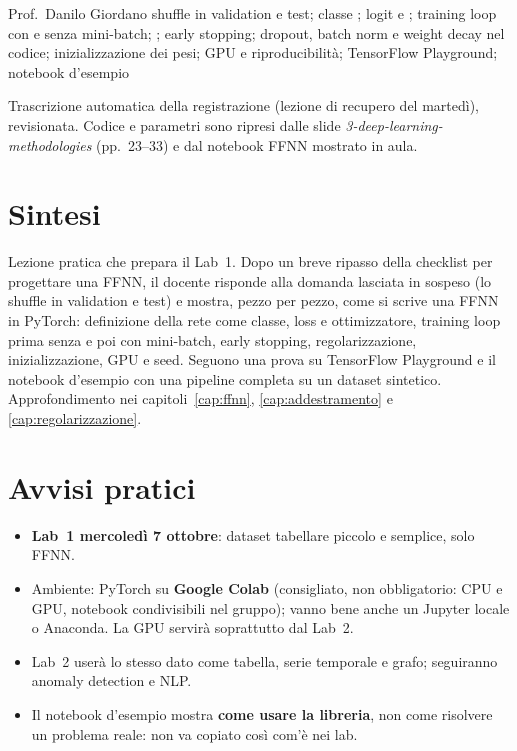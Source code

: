   {Prof.~Danilo Giordano}
  {shuffle in validation e test; classe ; logit e ; training
   loop con e senza mini-batch; ; early stopping; dropout, batch norm e weight
   decay nel codice; inizializzazione dei pesi; GPU e riproducibilità; TensorFlow Playground;
   notebook d'esempio}
\label{lez:2026-10-06}

\begin{nota}[Fonte]
Trascrizione automatica della registrazione (lezione di recupero del martedì), revisionata. Codice e
parametri sono ripresi dalle slide \emph{3-deep-learning-methodologies} (pp.~23--33) e dal notebook
FFNN mostrato in aula.
\end{nota}

\section{Sintesi}
Lezione pratica che prepara il Lab~1. Dopo un breve ripasso della checklist per progettare una FFNN,
il docente risponde alla domanda lasciata in sospeso (lo shuffle in validation e test) e mostra, pezzo
per pezzo, come si scrive una FFNN in PyTorch: definizione della rete come classe, loss e
ottimizzatore, training loop prima senza e poi con mini-batch, early stopping, regolarizzazione,
inizializzazione, GPU e seed. Seguono una prova su TensorFlow Playground e il notebook d'esempio con
una pipeline completa su un dataset sintetico. Approfondimento nei capitoli~\ref{cap:ffnn},
\ref{cap:addestramento} e \ref{cap:regolarizzazione}.

\section{Avvisi pratici}
\begin{itemize}
  \item \textbf{Lab~1 mercoledì 7 ottobre}: dataset tabellare piccolo e semplice, solo FFNN.
  \item Ambiente: PyTorch su \textbf{Google Colab} (consigliato, non obbligatorio: CPU e GPU, notebook
    condivisibili nel gruppo); vanno bene anche un Jupyter locale o Anaconda. La GPU servirà
    soprattutto dal Lab~2.
  \item Lab~2 userà lo stesso dato come tabella, serie temporale e grafo; seguiranno anomaly
    detection e NLP.
  \item Il notebook d'esempio mostra \textbf{come usare la libreria}, non come risolvere un problema
    reale: non va copiato così com'è nei lab.
\end{itemize}


